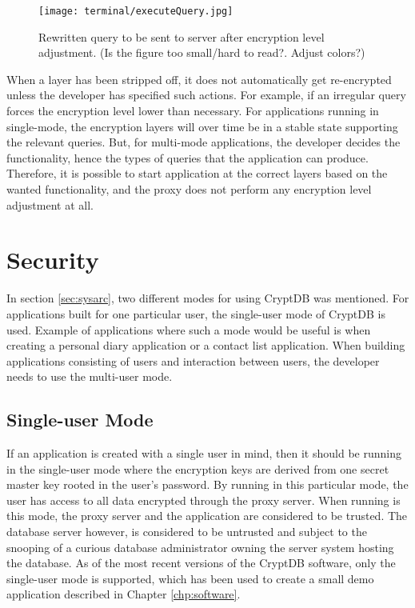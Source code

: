 \begin{figure}[h]
	\texttt{[image: terminal/executeQuery.jpg]}
	\caption{Rewritten query to be sent to server after encryption level adjustment. (Is the figure too small/hard to read?. Adjust colors?)}
	\label{rewritten_query}
\end{figure}

When a layer has been stripped off, it does not automatically get re-encrypted unless the developer has specified such actions. For example, if an irregular query forces the encryption level lower than necessary. For applications running in single-mode, the encryption layers will over time be in a stable state supporting the relevant queries. But, for multi-mode applications, the developer decides the functionality, hence the types of queries that the application can produce. Therefore, it is possible to start application at the correct layers based on the wanted functionality, and the proxy does not perform any encryption level adjustment at all.



\section{Security}

In section \ref{sec:sysarc}, two different modes for using CryptDB was mentioned. For applications built for one particular user, the single-user mode of CryptDB is used. Example of applications where such a mode would be useful is when creating a personal diary application or a contact list application. When building applications consisting of users and interaction between users, the developer needs to use the multi-user mode.

\subsection{Single-user Mode}
If an application is created with a single user in mind, then it should be running in the single-user mode where the encryption keys are derived from one secret master key rooted in the user's password. By running in this particular mode, the user has access to all data encrypted through the proxy server. When running is this mode, the proxy server and the application are considered to be trusted. The database server however, is considered to be untrusted and subject to the snooping of a curious database administrator owning the server system hosting the database. As of the most recent versions of the CryptDB software, only the single-user mode is supported, which has been used to create a small demo application described in Chapter \ref{chp:software}.


